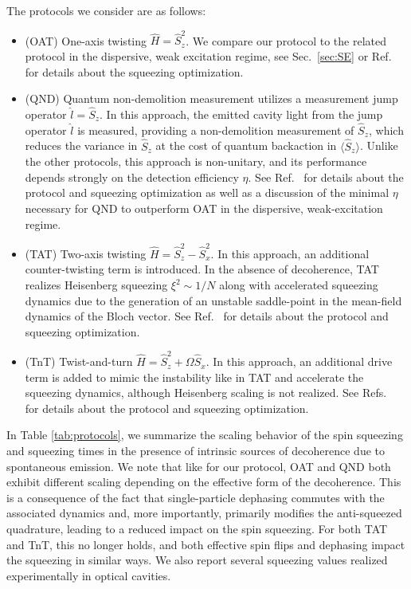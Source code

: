 \documentclass[11pt]{article}
\begin{document}
The protocols we consider are as follows:
\begin{itemize}
    \item (OAT) One-axis twisting $\hat H = \hat S_z^2$. We compare our protocol to the related protocol in the dispersive, weak excitation regime, see Sec.~\ref{sec:SE} or Ref.~\cite{Barberena2023b} for details about the squeezing optimization.
    \item (QND) Quantum non-demolition measurement utilizes a measurement jump operator $\hat l = \hat S_z$. In this approach, the emitted cavity light from the jump operator $\hat l$ is measured, providing a non-demolition measurement of $\hat S_z$, which reduces the variance in $\hat S_z$ at the cost of quantum backaction in $\langle \hat S_z \rangle$. Unlike the other protocols, this approach is non-unitary, and its performance depends strongly on the detection efficiency $\eta$. See Ref.~\cite{Barberena2023b} for details about the protocol and squeezing optimization as well as a discussion of the minimal $\eta$ necessary for QND to outperform OAT in the dispersive, weak-excitation regime.
    \item (TAT) Two-axis twisting $\hat H = \hat S_z^2 - \hat S_x^2$. In this approach, an additional counter-twisting term is introduced. In the absence of decoherence, TAT realizes Heisenberg squeezing $\xi^2 \sim 1/N$ along with accelerated squeezing dynamics due to the generation of an unstable saddle-point in the mean-field dynamics of the Bloch vector. See Ref.~\cite{Borregaard2017a} for details about the protocol and squeezing optimization.
    \item (TnT) Twist-and-turn $\hat H = \hat S_z^2 + \Omega \hat S_x$. In this approach, an additional drive term is added to mimic the instability like in TAT and accelerate the squeezing dynamics, although Heisenberg scaling is not realized. See Refs.~\cite{Muessel2015,Hu2017,Barberena2022} for details about the protocol and squeezing optimization.
\end{itemize}

In Table \ref{tab:protocols}, we summarize the scaling behavior of the spin squeezing and squeezing times in the presence of intrinsic sources of decoherence due to spontaneous emission. We note that like for our protocol, OAT and QND both exhibit different scaling depending on the effective form of the decoherence. This is a consequence of the fact that single-particle dephasing commutes with the associated dynamics and, more importantly, primarily modifies the anti-squeezed quadrature, leading to a reduced impact on the spin squeezing. For both TAT and TnT, this no longer holds, and both effective spin flips and dephasing impact the squeezing in similar ways. We also report several squeezing values realized experimentally in optical cavities.
\end{document}
